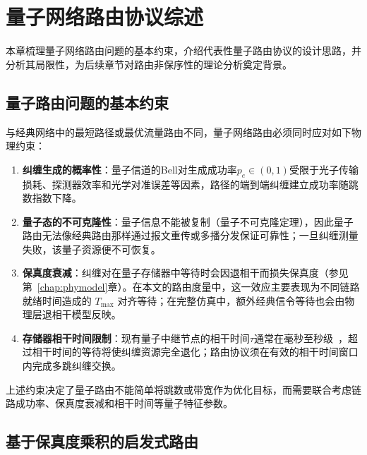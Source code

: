 %
%

\chapter{量子网络路由协议综述}
\label{chap:routing-survey}

本章梳理量子网络路由问题的基本约束，介绍代表性量子路由协议的设计思路，并分析其局限性，为后续章节对路由非保序性的理论分析奠定背景。

\section{量子路由问题的基本约束}
\label{sec:routing-constraints}

与经典网络中的最短路径或最优流量路由不同，量子网络路由必须同时应对如下物理约束：

\begin{enumerate}
  \item \textbf{纠缠生成的概率性}：量子信道的Bell对生成成功率$p_e \in (0, 1)$受限于光子传输损耗、探测器效率和光学对准误差等因素，路径的端到端纠缠建立成功率随跳数指数下降。

  \item \textbf{量子态的不可克隆性}：量子信息不能被复制（量子不可克隆定理），因此量子路由无法像经典路由那样通过报文重传或多播分发保证可靠性；一旦纠缠测量失败，该量子资源便不可恢复。

  \item \textbf{保真度衰减}：纠缠对在量子存储器中等待时会因退相干而损失保真度（参见第~\ref{chap:phymodel}章）。在本文的路由度量中，这一效应主要表现为不同链路就绪时间造成的 $T_{\max}$ 对齐等待；在完整仿真中，额外经典信令等待也会由物理层退相干模型反映。

  \item \textbf{存储器相干时间限制}：现有量子中继节点的相干时间$\tau$通常在毫秒至秒级~\cite{lin2024controlflowadaptionefficient}，超过相干时间的等待将使纠缠资源完全退化；路由协议须在有效的相干时间窗口内完成多跳纠缠交换。
\end{enumerate}

上述约束决定了量子路由不能简单将跳数或带宽作为优化目标，而需要联合考虑链路成功率、保真度衰减和相干时间等量子特征参数。

\section{基于保真度乘积的启发式路由}
\label{sec:dijkstra-routing}

